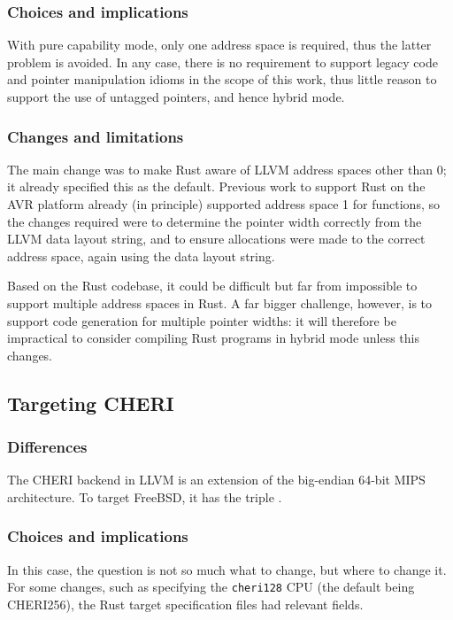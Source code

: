 \documentclass[dissertation.tex]{subfiles}
\begin{document}
\subsubsection{Choices and implications}
With pure capability mode, only one address space is required, thus the
latter problem is avoided.
In any case, there is no requirement to support legacy code and pointer
manipulation idioms in the scope of this work, thus little reason to
support the use of untagged pointers, and hence hybrid mode.

\subsubsection{Changes and limitations}
The main change was to make Rust aware of LLVM address spaces other than
0; it already specified this as the default.
Previous work to support Rust on the AVR platform already (in principle)
supported address space 1 for functions, so the changes required were to
determine the pointer width correctly from the LLVM data layout string,
and to ensure allocations were made to the correct address space, again
using the data layout string.

Based on the Rust codebase, it could be difficult but far from
impossible to support multiple address spaces in Rust.
A far bigger challenge, however, is to support code generation for
multiple pointer widths: it will therefore be impractical to consider
compiling Rust programs in hybrid mode unless this changes.


\subsection{Targeting CHERI}
\label{sec:impl-cheritarget}

\subsubsection{Differences}
The CHERI backend in LLVM is an extension of the big-endian 64-bit MIPS
architecture.
To target FreeBSD, it has the triple \cuf.

\subsubsection{Choices and implications}
In this case, the question is not so much what to change, but where to
change it.
For some changes, such as specifying the \texttt{cheri128} CPU (the
default being CHERI256), the Rust target specification files had
relevant fields.
\end{document}
